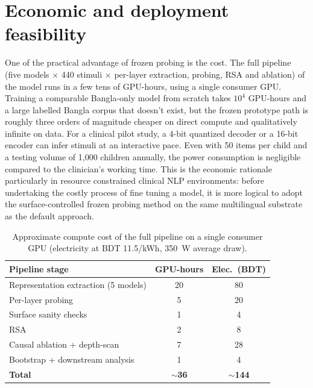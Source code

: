 \documentclass[preprint,12pt]{elsarticle}
\begin{document}
\section{Economic and deployment feasibility}
\label{sec:cost}
One of the practical advantage of frozen probing is the cost. The full pipeline (five models $\times$ 440 stimuli $\times$ per-layer extraction, probing, RSA and ablation) of the model runs in a few tens of GPU-hours, using a single consumer GPU. Training a comparable Bangla-only model from scratch takes $10^{4}$ GPU-hours and a large labelled Bangla corpus that doesn't exist, but the frozen prototype path is roughly three orders of magnitude cheaper on direct compute and qualitatively infinite on data. For a clinical pilot study, a 4-bit quantized decoder or a 16-bit encoder can infer stimuli at an interactive pace. Even with 50 items per child and a testing volume of 1,000 children annually, the power consumption is negligible compared to the clinician's working time. This is the economic rationale particularly in resource constrained clinical NLP environments: before undertaking the costly process of fine tuning a model, it is more logical to adopt the surface-controlled frozen probing method on the same multilingual substrate as the default approach.

\begin{table}[H]
\caption{Approximate compute cost of the full pipeline on a single consumer GPU (electricity at BDT 11.5/kWh, 350~W average draw).}
\label{tab:cost}
\centering
\small
\setlength{\tabcolsep}{5pt}
\begin{tabular}{lcc}
\toprule
\textbf{Pipeline stage} & \textbf{GPU-hours} & \textbf{Elec.\ (BDT)} \\
\midrule
Representation extraction (5 models) & 20 & 80 \\
Per-layer probing & 5 & 20 \\
Surface sanity checks & 1 & 4 \\
RSA & 2 & 8 \\
Causal ablation + depth-scan & 7 & 28 \\
Bootstrap + downstream analysis & 1 & 4 \\
\midrule
\textbf{Total} & \textbf{$\sim$36} & \textbf{$\sim$144} \\
\bottomrule
\end{tabular}
\end{table}

\end{document}
